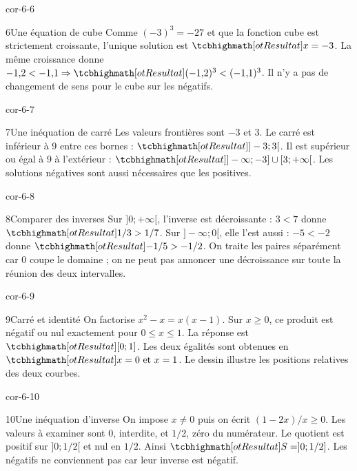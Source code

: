 \begin{blocLivre}{cor-6-6}
\begin{corrige}{6}{Une équation de cube}
Comme $(-3)^3=-27$ et que la fonction cube est strictement croissante, l’unique solution est $\res{x=-3}$. La même croissance donne $-1{,}2<-1{,}1\Rightarrow\res{(-1{,}2)^3<(-1{,}1)^3}$. Il n’y a pas de changement de sens pour le cube sur les négatifs.
\label{fig-cor-6-6}
\end{corrige}
\end{blocLivre}
\begin{blocLivre}{cor-6-7}
\begin{corrige}{7}{Une inéquation de carré}
Les valeurs frontières sont $-3$ et 3. Le carré est inférieur à 9 entre ces bornes : $\res{]-3;3[}$. Il est supérieur ou égal à 9 à l’extérieur : $\res{]-\infty;-3]\cup[3;+\infty[}$. Les solutions négatives sont aussi nécessaires que les positives.
\label{fig-cor-6-7}
\end{corrige}
\end{blocLivre}
\begin{blocLivre}{cor-6-8}
\begin{corrige}{8}{Comparer des inverses}
Sur $]0;+\infty[$, l’inverse est décroissante : $3<7$ donne $\res{1/3>1/7}$. Sur $]-\infty;0[$, elle l’est aussi : $-5<-2$ donne $\res{-1/5>-1/2}$. On traite les paires séparément car 0 coupe le domaine ; on ne peut pas annoncer une décroissance sur toute la réunion des deux intervalles.
\end{corrige}
\end{blocLivre}
\begin{blocLivre}{cor-6-9}
\begin{corrige}{9}{Carré et identité}
On factorise $x^2-x=x(x-1)$. Sur $x\ge0$, ce produit est négatif ou nul exactement pour $0\le x\le1$. La réponse est $\res{[0;1]}$. Les deux égalités sont obtenues en $\res{x=0\text{ et }x=1}$. Le dessin illustre les positions relatives des deux courbes.
\label{fig-cor-6-9}
\end{corrige}
\end{blocLivre}
\begin{blocLivre}{cor-6-10}
\begin{corrige}{10}{Une inéquation d’inverse}
On impose $x\ne0$ puis on écrit $(1-2x)/x\ge0$. Les valeurs à examiner sont 0, interdite, et $1/2$, zéro du numérateur. Le quotient est positif sur $]0;1/2[$ et nul en $1/2$. Ainsi $\res{S=]0;1/2]}$. Les négatifs ne conviennent pas car leur inverse est négatif.
\end{corrige}
\end{blocLivre}
